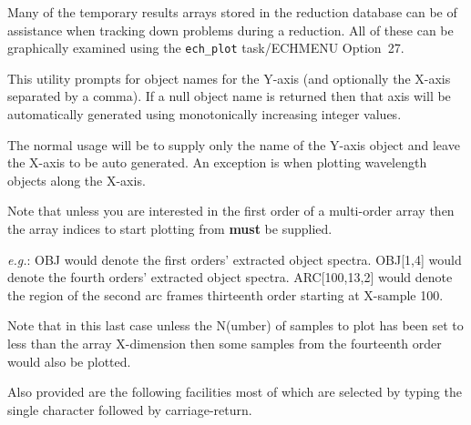

Many of the temporary results arrays stored in the reduction database can
be of assistance when tracking down problems during a reduction. All of
these can be graphically examined using the \verb+ech_plot+ task/ECHMENU
Option~27.

This utility prompts for object names for the Y-axis (and optionally the
X-axis separated by a comma). If a null object name is returned then that
axis will be automatically generated using monotonically increasing integer
values.

The normal usage will be to supply only the name of the Y-axis object and
leave the X-axis to be auto generated. An exception is when plotting
wavelength objects along the X-axis.

Note that unless you are interested in  the first order of a multi-order
array then the array indices to start plotting from {\bf must} be supplied.

{\it{e.g.}}: OBJ would denote the first orders' extracted object spectra.
OBJ[1,4] would denote the fourth orders' extracted object spectra.
ARC[100,13,2] would denote the region of the second arc frames thirteenth
order starting at X-sample 100.

Note that in this last case unless the N(umber) of samples to plot has been
set to less than the array X-dimension then some samples from the
fourteenth order would also be plotted.

Also provided are the following facilities most of which are selected by
typing the single character followed by carriage-return.

